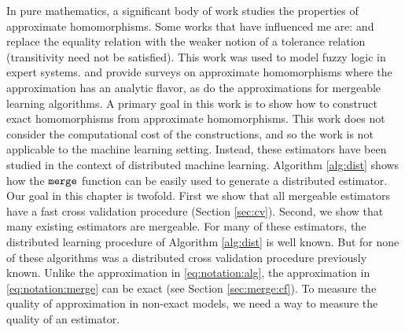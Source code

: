 \documentclass[thesis.tex]{subfiles}
\newcommand{\merge}{\mkprocedure{merge}}
\begin{document}
{    In pure mathematics, a significant body of work studies the properties of approximate homomorphisms.
    Some works that have influenced me are:
    \citet{zelinka1970tolerance} and \citet{zelinka1975tolerance} replace the equality relation with the weaker notion of a tolerance relation (transitivity need not be satisfied).
    This work was used to model fuzzy logic in expert systems. 
    \citet{kotschick2004quasi} and \citet{green2014approximate} provide surveys on approximate homomorphisms where the approximation has an analytic flavor, 
    as do the approximations for mergeable learning algorithms.
    A primary goal in this work is to show how to construct exact homomorphisms from approximate homomorphisms.
    This work does not consider the computational cost of the constructions,
    and so the work is not applicable to the machine learning setting. 
}
Instead, these estimators have been studied in the context of distributed machine learning.
Algorithm \ref{alg:dist} shows how the $\merge$ function can be easily used to generate a distributed estimator.
Our goal in this chapter is twofold.
First we show that all mergeable estimators have a fast cross validation procedure (Section \ref{sec:cv}).
Second, we show that many existing estimators are mergeable.
For many of these estimators, the distributed learning procedure of Algorithm \ref{alg:dist} is well known.
But for none of these algorithms was a distributed cross validation procedure previously known.
Unlike the approximation in \eqref{eq:notation:alg},
the approximation in \eqref{eq:notation:merge} can be exact (see Section \ref{sec:merge:cf}).
To measure the quality of approximation in non-exact models,
we need a way to measure the quality of an estimator.

\end{document}
